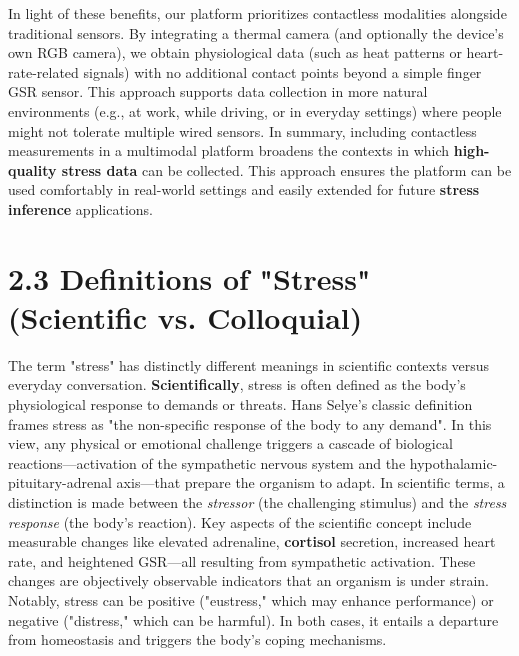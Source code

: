In light of these benefits, our platform prioritizes contactless modalities alongside traditional sensors. By integrating a thermal camera (and optionally the device's own RGB camera), we obtain physiological data (such as heat patterns or heart-rate-related signals) with no additional contact points beyond a simple finger GSR sensor. This approach supports data collection in more natural environments (e.g., at work, while driving, or in everyday settings) where people might not tolerate multiple wired sensors. In summary, including contactless measurements in a multimodal platform broadens the contexts in which \textbf{high-quality stress data} can be collected. This approach ensures the platform can be used comfortably in real-world settings and easily extended for future \textbf{stress inference} applications.

\section{2.3 Definitions of "Stress" (Scientific vs. Colloquial)}

The term "stress" has distinctly different meanings in scientific contexts versus everyday conversation. \textbf{Scientifically}, stress is often defined as the body's physiological response to demands or threats. Hans Selye's classic definition frames stress as "the non-specific response of the body to any demand"\cite{StressDefinitionHH}. In this view, any physical or emotional challenge triggers a cascade of biological reactions—activation of the sympathetic nervous system and the hypothalamic-pituitary-adrenal axis—that prepare the organism to adapt. In scientific terms, a distinction is made between the \textit{stressor} (the challenging stimulus) and the \textit{stress response} (the body's reaction). Key aspects of the scientific concept include measurable changes like elevated adrenaline, \textbf{cortisol} secretion, increased heart rate, and heightened GSR—all resulting from sympathetic activation\cite{CortisolStressIndicator2020}. These changes are objectively observable indicators that an organism is under strain. Notably, stress can be positive ("eustress," which may enhance performance) or negative ("distress," which can be harmful). In both cases, it entails a departure from homeostasis and triggers the body's coping mechanisms.

